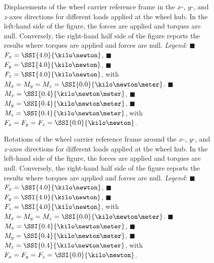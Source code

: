 \begin{figure}[htb]
  \centering
  \small{}
  \caption{Displacements of the wheel carrier reference frame in the $x$-, $y$-, and $z$-axes directions for different loads applied at the wheel hub. In the left-hand side of the figure, the forces are applied and torques are null. Conversely, the right-hand half side of the figure reports the results where torques are applied and forces are null. \emph{Legend:} {\color{mycolor1}$\blacksquare$}~$F_x = \SSI{4.0}{\kilo\newton}$, {\color{mycolor2}$\blacksquare$}~$F_y = \SSI{4.0}{\kilo\newton}$, {\color{mycolor3}$\blacksquare$}~$F_z = \SSI{4.0}{\kilo\newton}$, with $M_x = M_y = M_z = \SSI{0.0}{\kilo\newton\meter}$. {\color{mycolor4}$\blacksquare$}~$M_x = \SSI{0.4}{\kilo\newton\meter}$, {\color{mycolor5}$\blacksquare$}~$M_y = \SSI{0.4}{\kilo\newton\meter}$, {\color{mycolor6}$\blacksquare$}~$M_z = \SSI{0.4}{\kilo\newton\meter}$, with $F_x = F_y = F_z = \SSI{0.0}{\kilo\newton}$.}
  \label{app4:fig:translations}
\end{figure}

\begin{figure}[htb]
  \centering
  \small{}
  \caption{Rotations of the wheel carrier reference frame around the $x$-, $y$-, and $z$-axes directions for different loads applied at the wheel hub. In the left-hand side of the figure, the forces are applied and torques are null. Conversely, the right-hand half side of the figure reports the results where torques are applied and forces are null. \emph{Legend:} {\color{mycolor1}$\blacksquare$}~$F_x = \SSI{4.0}{\kilo\newton}$, {\color{mycolor2}$\blacksquare$}~$F_y = \SSI{4.0}{\kilo\newton}$, {\color{mycolor3}$\blacksquare$}~$F_z = \SSI{4.0}{\kilo\newton}$, with $M_x = M_y = M_z = \SSI{0.0}{\kilo\newton\meter}$. {\color{mycolor4}$\blacksquare$}~$M_x = \SSI{0.4}{\kilo\newton\meter}$, {\color{mycolor5}$\blacksquare$}~$M_y = \SSI{0.4}{\kilo\newton\meter}$, {\color{mycolor6}$\blacksquare$}~$M_z = \SSI{0.4}{\kilo\newton\meter}$, with $F_x = F_y = F_z = \SSI{0.0}{\kilo\newton}$.}
  \label{app4:fig:rotations}
\end{figure}

